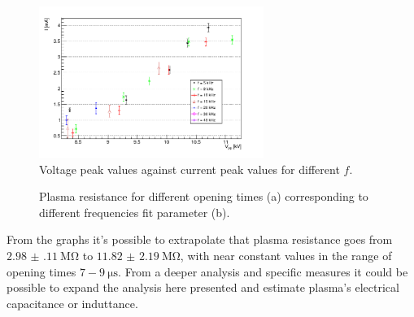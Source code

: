 \begin{figure}
 \centering
 \includegraphics[width=0.65\textwidth]{Images/Electric/VI_B.png}
 \caption{Voltage peak values against current peak values for different $f$.}
 \label{fig:viplot}
\end{figure}

\begin{figure}
 \centering
 \caption{Plasma resistance for different opening times (a) corresponding to different frequencies fit parameter (b).}
 \label{fig:zest}
\end{figure}

From the graphs it's possible to extrapolate that plasma resistance goes from $\SI{2.98(11)}{\mega\ohm}$ to $\SI{11.82(219)}{\mega\ohm}$, with near constant values in the range of opening times $7-\SI{9}{\micro\second}$.
From a deeper analysis and specific measures it could be possible to expand the analysis here presented and estimate plasma's electrical capacitance or induttance.




